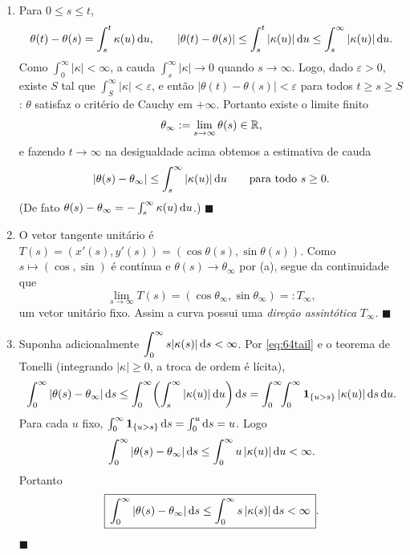 \begin{enumerate}[label=(\alph*)]

\item Para $0\le s\le t$,
\[
\theta(t)-\theta(s)=\int_s^t\kappa(u)\,\mathrm{d} u,\qquad
|\theta(t)-\theta(s)|\le\int_s^t|\kappa(u)|\,\mathrm{d} u\le\int_s^\infty|\kappa(u)|\,\mathrm{d} u.
\]
Como $\int_0^\infty|\kappa|<\infty$, a cauda $\int_s^\infty|\kappa|\to0$ quando $s\to\infty$. Logo, dado $\varepsilon>0$, existe $S$ tal que $\int_S^\infty|\kappa|<\varepsilon$, e então $|\theta(t)-\theta(s)|<\varepsilon$ para todos $t\ge s\ge S$: $\theta$ satisfaz o critério de Cauchy em $+\infty$. Portanto existe o limite finito
\[
\theta_\infty:=\lim_{s\to\infty}\theta(s)\in\mathbb{R},
\]
e fazendo $t\to\infty$ na desigualdade acima obtemos a estimativa de cauda
\begin{equation}\label{eq:64tail}
|\theta(s)-\theta_\infty|\le\int_s^\infty|\kappa(u)|\,\mathrm{d} u\qquad\text{para todo }s\ge0.
\end{equation}
(De fato $\theta(s)-\theta_\infty=-\int_s^\infty\kappa(u)\,\mathrm{d} u$.) \qquad$\blacksquare$

\item O vetor tangente unitário é $T(s)=(x'(s),y'(s))=(\cos\theta(s),\sin\theta(s))$. Como $s\mapsto(\cos,\sin)$ é contínua e $\theta(s)\to\theta_\infty$ por (a), segue da continuidade que
\[
\lim_{s\to\infty}T(s)=(\cos\theta_\infty,\sin\theta_\infty)=:T_\infty,
\]
um vetor unitário fixo. Assim a curva possui uma \emph{direção assintótica} $T_\infty$. \qquad$\blacksquare$

\item Suponha adicionalmente $\displaystyle\int_0^\infty s|\kappa(s)|\,\mathrm{d} s<\infty$. Por \eqref{eq:64tail} e o teorema de Tonelli (integrando $|\kappa|\ge0$, a troca de ordem é lícita),
\[
\int_0^\infty|\theta(s)-\theta_\infty|\,\mathrm{d} s
\le\int_0^\infty\!\left(\int_s^\infty|\kappa(u)|\,\mathrm{d} u\right)\mathrm{d} s
=\int_0^\infty\!\!\int_0^\infty\mathbf 1_{\{u>s\}}\,|\kappa(u)|\,\mathrm{d} s\,\mathrm{d} u .
\]
Para cada $u$ fixo, $\int_0^\infty\mathbf 1_{\{u>s\}}\,\mathrm{d} s=\int_0^u\mathrm{d} s=u$. Logo
\[
\int_0^\infty|\theta(s)-\theta_\infty|\,\mathrm{d} s\le\int_0^\infty u\,|\kappa(u)|\,\mathrm{d} u<\infty.
\]
Portanto
\[
\boxed{\,\int_0^\infty|\theta(s)-\theta_\infty|\,\mathrm{d} s\le\int_0^\infty s\,|\kappa(s)|\,\mathrm{d} s<\infty\,}.
\]
\qquad$\blacksquare$


\end{enumerate}
